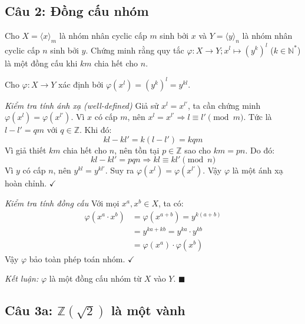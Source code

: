 \subsection*{Câu 2: Đồng cấu nhóm}

\begin{questionbox}
Cho $X = \langle x \rangle_m$ là nhóm nhân cyclic cấp $m$ sinh bởi $x$ và $Y = \langle y \rangle_n$ là nhóm nhân cyclic cấp $n$ sinh bởi $y$. Chứng minh rằng quy tắc $\varphi: X \to Y; x^l \mapsto (y^k)^l$ ($k \in \mathbb{N}^*$) là một đồng cấu khi $km$ chia hết cho $n$.
\end{questionbox}

\begin{solution}
Cho $\varphi: X \to Y$ xác định bởi $\varphi(x^l) = (y^k)^l = y^{kl}$.

\textit{Kiểm tra tính ánh xạ (well-defined)}
Giả sử $x^l = x^{l'}$, ta cần chứng minh $\varphi(x^l) = \varphi(x^{l'})$.
Vì $x$ có cấp $m$, nên $x^l = x^{l'} \Rightarrow l \equiv l' \pmod m$.
Tức là $l - l' = qm$ với $q \in \mathbb{Z}$.
Khi đó:
\[
    kl - kl' = k(l - l') = kqm
\]
Vì giả thiết $km$ chia hết cho $n$, nên tồn tại $p \in \mathbb{Z}$ sao cho $km = pn$. Do đó:
\[
    kl - kl' = pqn \Rightarrow kl \equiv kl' \pmod n
\]
Vì $y$ có cấp $n$, nên $y^{kl} = y^{kl'}$. Suy ra $\varphi(x^l) = \varphi(x^{l'})$.
Vậy $\varphi$ là một ánh xạ hoàn chỉnh. $\checkmark$

\textit{Kiểm tra tính đồng cấu}
Với mọi $x^a, x^b \in X$, ta có:
\begin{align*}
    \varphi(x^a \cdot x^b) &= \varphi(x^{a+b}) = y^{k(a+b)} \\
    &= y^{ka + kb} = y^{ka} \cdot y^{kb} \\
    &= \varphi(x^a) \cdot \varphi(x^b)
\end{align*}
Vậy $\varphi$ bảo toàn phép toán nhóm. $\checkmark$

\textit{Kết luận:} $\varphi$ là một đồng cấu nhóm từ $X$ vào $Y$. $\blacksquare$
\end{solution}

\subsection*{Câu 3a: $\mathbb{Z}(\sqrt{2})$ là một vành}

